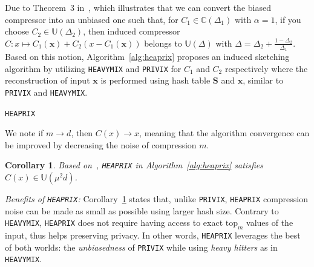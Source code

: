 \documentclass[twoside]{article}
\newtheorem{corollary}{Corollary}
\begin{document}
Due to Theorem~$3$ in~\cite{horvath2020better}, which illustrates that we can convert the biased compressor into an unbiased one such that, for $C_1\in \mathbb{C}(\Delta_1)$ with $\alpha=1$, if you choose $C_2\in \mathbb{U}(\Delta_2)$, then induced compressor $C: x \mapsto C_1(\mathbf{x})+C_2\left(x-C_1\left(\mathbf{x}\right)\right)$ belongs to $\mathbb{U}(\Delta)$ with $\Delta=\Delta_2+\frac{1-\Delta_2}{\Delta_1}$. Based on this notion, Algorithm~\ref{alg:heaprix} proposes an induced sketching algorithm by utilizing \texttt{HEAVYMIX} and \texttt{PRIVIX} for $C_1$ and $C_2$ respectively where the reconstruction of input $\mathbf{x}$ is performed using hash table $\mathbf{S}$ and $\mathbf{x}$, similar to \texttt{PRIVIX} and \texttt{HEAVYMIX}.
\begin{algorithm}[H]
\caption{\texttt{HEAPRIX} }\label{alg:heaprix}
\begin{algorithmic}[1]
\end{algorithmic}
\end{algorithm}
We note if $m\rightarrow d$, then $C(x)\rightarrow x$, meaning that the algorithm convergence can be improved by decreasing the noise of compression $m$. 
\begin{corollary}\label{cor:small}
Based on~\cite[Theorem 3]{horvath2020better}, \texttt{HEAPRIX} in Algorithm~\ref{alg:heaprix} satisfies $C(x)\in \mathbb{U}(\mu^2 d)$. 
\end{corollary}
\textit{Benefits of \texttt{HEAPRIX}:} Corollary~\ref{cor:small} states that, unlike \texttt{PRIVIX}, \texttt{HEAPRIX} compression noise can be made as small as possible using larger hash size. 
Contrary to \texttt{HEAVYMIX}, \texttt{HEAPRIX} does not require having access to exact $\text{top}_m$ values of the input, thus helps preserving privacy. 
In other words, \texttt{HEAPRIX} leverages the best of both worlds: the \emph{unbiasedness} of \texttt{PRIVIX} while using \emph{heavy hitters} as in \texttt{HEAVYMIX}.
\end{document}
